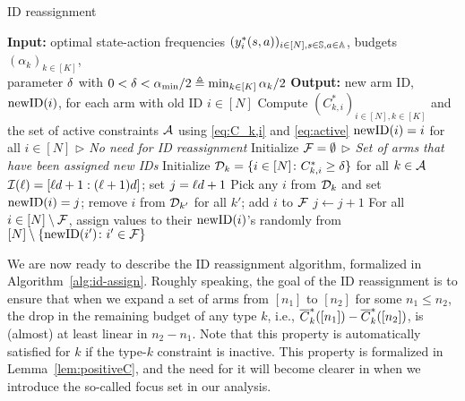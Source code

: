 \documentclass[11pt,letterpaper]{article}
\begin{document}
\begin{algorithm}[t]
     \caption{ID reassignment}\label{alg:id-assign}
     \begin{algorithmic}[1]
        \STATE \textbf{Input:} optimal state-action frequencies $(y^*_i(s,a))_{i\in [N], s\in\mathbb{S},a\in\mathbb{A}}$, budgets $(\alpha_k)_{k\in[K]}$, \\
        \hspace{0.47in}parameter $\delta$ with $0<\delta<\alpha_{\min}/2\triangleq \min_{k\in[K]}\alpha_k/2$
        \STATE \textbf{Output:} new arm ID, $\text{newID}(i)$, for each arm with old ID $i\in[N]$
        \STATE Compute $(C_{k,i}^*)_{i\in[N],k\in[K]}$ and the set of active constraints $\mathcal{A}$ using \eqref{eq:C_k,i} and \eqref{eq:active}
        \IF{$\cA=\emptyset$}
        \STATE $\text{newID}(i)=i$ for all $i\in[N]$  \hfill \emph{$\triangleright$ No need for ID reassignment}
        \ELSE 
        \STATE Initialize $\mathcal{F} = \emptyset$ \hfill\emph{$\triangleright$ Set of arms that have been assigned new IDs}
        \STATE Initialize $\mathcal{D}_k=\{i\in[N]\colon C_{k,i}^*\ge \delta\}$ for all $k\in\mathcal{A}$\\
        \STATE $\mathcal{I}(\ell) = [\ell d+1:(\ell+1)d]$; set $j=\ell d+1$
        \label{alg:line:reassign-start}
            \STATE Pick any $i$ from $\mathcal{D}_k$ and set $\text{newID}(i)=j$; remove $i$ from $\mathcal{D}_{k'}$ for all $k'$; add $i$ to $\mathcal{F}$
            \STATE $j\gets j+1$
            \ENDIF
        \ENDFOR\label{alg:line:reassign-end}
        \ENDFOR
        \STATE For all $i\in [N]\setminus \mathcal{F}$, assign values to their $\text{newID}(i)$'s randomly from $[N]\setminus \{\text{newID}(i')\colon i'\in \mathcal{F}\}$
        \ENDIF
     \end{algorithmic}
 \end{algorithm}
We are now ready to describe the ID reassignment algorithm, formalized in Algorithm~\ref{alg:id-assign}.
Roughly speaking, the goal of the ID reassignment is to ensure that when we expand a set of arms from $[n_1]$ to $[n_2]$ for some $n_1\le n_2$, the drop in the remaining budget of any type $k$, i.e., $\overline{C}^*_k([n_1])-\overline{C}^*_k([n_2])$, is (almost) at least linear in $n_2-n_1$.
Note that this property is automatically satisfied for $k$ if the type-$k$ constraint is inactive.
This property is formalized in Lemma~\ref{lem:positiveC}, and the need for it will become clearer in  when we introduce the so-called focus set in our analysis. 
\end{document}

